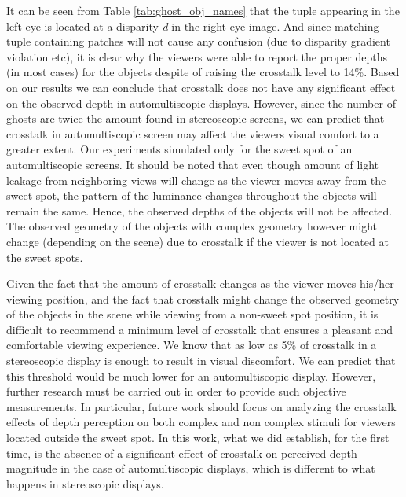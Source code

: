 It can be seen from Table \ref{tab:ghost_obj_names} that the tuple appearing in the left eye is located at a disparity \emph{d} in the right eye image. And since matching tuple containing patches will not cause any confusion (due to disparity gradient violation etc), it is clear why the viewers were able to report the proper depths (in most cases) for the objects despite of raising the crosstalk level to 14\%. Based on our results we can conclude that crosstalk does not have any significant effect on the observed depth in automultiscopic displays. However, since the number of ghosts are twice the amount found in stereoscopic screens, we can predict that crosstalk in automultiscopic screen may affect the viewers visual comfort to a greater extent. Our experiments simulated only for the sweet spot of an automultiscopic screens. It should be noted that even though amount of light leakage from neighboring views will change as the viewer moves away from the sweet spot, the pattern of the luminance changes throughout the objects will remain the same. Hence, the observed depths of the objects will not be affected. The observed geometry of the objects with complex geometry however might change (depending on the scene) due to crosstalk if the viewer is not located at the sweet spots.

Given the fact that the amount of crosstalk changes as the viewer moves his/her viewing position, and the fact that crosstalk might change the observed geometry of the objects in the scene while viewing from a non-sweet spot position, it is difficult to recommend a minimum level of crosstalk that ensures a pleasant and comfortable viewing experience. We know that as low as 5\% of crosstalk in a stereoscopic display is enough to result in visual discomfort. We can predict that this threshold would be much lower for an automultiscopic display. However, further research must be carried out in order to provide such objective measurements. In particular, future work should focus on analyzing the crosstalk effects of depth perception on both complex and non complex stimuli for viewers located outside the sweet spot. In this work, what we did establish, for the first time, is the absence of a significant effect of crosstalk on perceived depth magnitude in the case of automultiscopic displays, which is different to what happens in stereoscopic displays.
